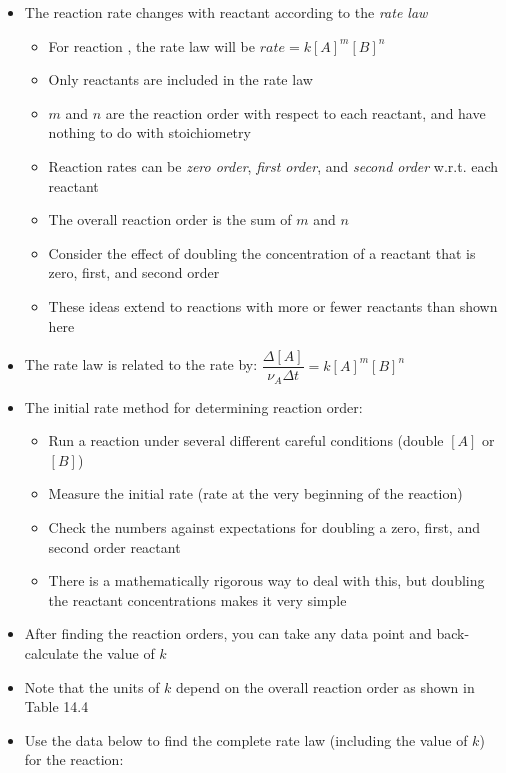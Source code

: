 \documentclass[12pt, openany, letterpaper]{memoir}
\begin{document}
\begin{itemize}
	\begin{tabular}{c|c|c|c|c}
		{\bfseries Time (s)}&$0$&$5$&$10$&$15$ \\ \midrule
		{\bfseries $\left[B\right](M)$}&$0$&$0.0160$&$0.0295$&$0.0503$
	\end{tabular}
	\item The reaction rate changes with reactant  according to the \emph{rate law}
	\begin{itemize}
		\item For reaction , the rate law will be $rate=k\left[A\right]^m\left[B\right]^n$
		\item Only reactants are included in the rate law
		\item $m$ and $n$ are the reaction order with respect to each reactant, and have nothing to do with stoichiometry
		\item Reaction rates can be \emph{zero order}, \emph{first order}, and \emph{second order} w.r.t. each reactant
		\item The overall reaction order is the sum of $m$ and $n$
		\item Consider the effect of doubling the concentration of a reactant that is zero, first, and second order
		\item These ideas extend to reactions with more or fewer reactants than shown here
	\end{itemize}
	\item The rate law is related to the rate by: $\dfrac{\Delta\left[A\right]}{\nu_A\Delta t}=k\left[A\right]^m\left[B\right]^n$
	\item The initial rate method for determining reaction order:
	\begin{itemize}
		\item Run a reaction under several different careful conditions (double $\left[A\right]$ or $\left[B\right]$)
		\item Measure the initial rate (rate at the very beginning of the reaction)
		\item Check the numbers against expectations for doubling a zero, first, and second order reactant
		\item There is a mathematically rigorous way to deal with this, but doubling the reactant concentrations makes it very simple
	\end{itemize}
	\item After finding the reaction orders, you can take any data point and back-calculate the value of $k$
	\item Note that the units of $k$ depend on the overall reaction order as shown in Table 14.4
	\item Use the data below to find the complete rate law (including the value of $k$) for the reaction:
	

\end{itemize}
\end{document}

